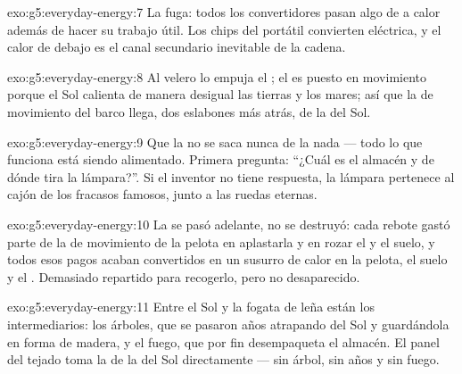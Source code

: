 \begin{solution}{exo:g5:everyday-energy:7}
La fuga: todos los convertidores pasan algo de  a calor
además de hacer su trabajo útil. Los chips del portátil convierten
 eléctrica, y el calor de debajo es el canal secundario
inevitable de la cadena.
\end{solution}

\begin{solution}{exo:g5:everyday-energy:8}
Al velero lo empuja el ; el  es  puesto en
movimiento porque el Sol calienta de manera desigual las tierras y los
mares; así que la  de movimiento del barco llega, dos
eslabones más atrás, de la  del Sol.
\end{solution}

\begin{solution}{exo:g5:everyday-energy:9}
Que la  no se saca nunca de la nada --- todo lo que funciona
está siendo alimentado. Primera pregunta: ``¿Cuál es el almacén y de
dónde tira la lámpara?''. Si el inventor no tiene respuesta, la
lámpara pertenece al cajón de los fracasos famosos, junto a las ruedas
eternas.
\end{solution}

\begin{solution}{exo:g5:everyday-energy:10}
La  se pasó adelante, no se destruyó: cada rebote gastó parte
de la  de movimiento de la pelota en aplastarla y en rozar el
 y el suelo, y todos esos pagos acaban convertidos en un susurro
de calor en la pelota, el suelo y el . Demasiado repartido para
recogerlo, pero no desaparecido.
\end{solution}

\begin{solution}{exo:g5:everyday-energy:11}
Entre el Sol y la fogata de leña están los intermediarios: los
árboles, que se pasaron años atrapando  del Sol y guardándola en
forma de madera, y el fuego, que por fin desempaqueta el almacén. El
panel del tejado toma la  de la  del Sol directamente ---
sin árbol, sin años y sin fuego.
\end{solution}
